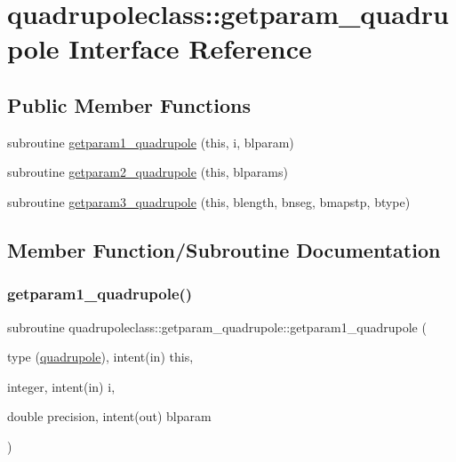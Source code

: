 \hypertarget{interfacequadrupoleclass_1_1getparam__quadrupole}{}\section{quadrupoleclass\+::getparam\+\_\+quadrupole Interface Reference}
\label{interfacequadrupoleclass_1_1getparam__quadrupole}
\subsection*{Public Member Functions}
\begin{DoxyCompactItemize}
\item 
subroutine \mbox{\hyperlink{interfacequadrupoleclass_1_1getparam__quadrupole_a174e53bb9d32d6684469d35ed27d3779}{getparam1\+\_\+quadrupole}} (this, i, blparam)
\item 
subroutine \mbox{\hyperlink{interfacequadrupoleclass_1_1getparam__quadrupole_a3a1cfa281d5e6b0e32bc505b252b5e90}{getparam2\+\_\+quadrupole}} (this, blparams)
\item 
subroutine \mbox{\hyperlink{interfacequadrupoleclass_1_1getparam__quadrupole_ab47260d217f2b2e9d7da32c7f0f2e0c5}{getparam3\+\_\+quadrupole}} (this, blength, bnseg, bmapstp, btype)
\end{DoxyCompactItemize}


\subsection{Member Function/\+Subroutine Documentation}
\mbox{\label{interfacequadrupoleclass_1_1getparam__quadrupole_a174e53bb9d32d6684469d35ed27d3779}} 
\subsubsection{\texorpdfstring{getparam1\_quadrupole()}{getparam1\_quadrupole()}}
{\footnotesize\ttfamily subroutine quadrupoleclass\+::getparam\+\_\+quadrupole\+::getparam1\+\_\+quadrupole (\begin{DoxyParamCaption}\item[{type (\mbox{\hyperlink{namespacequadrupoleclass_structquadrupoleclass_1_1quadrupole}{quadrupole}}), intent(in)}]{this,  }\item[{integer, intent(in)}]{i,  }\item[{double precision, intent(out)}]{blparam }\end{DoxyParamCaption})}

